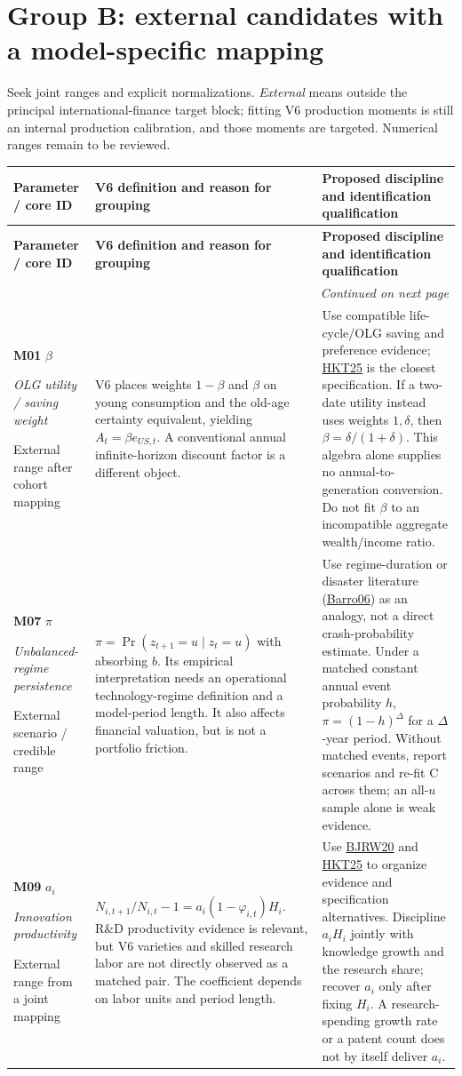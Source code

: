 \documentclass[10pt,a4paper,landscape]{article}
\makeatletter
\newcommand{\lit}[2]{\hyperlink{ref:#1}{#2}}
\newenvironment{grouptable}{%
\fontsize{9.4}{10.8}\selectfont\setlength{\parskip}{1.5pt}
\begin{longtable}{@{}P{\dimexpr .18\textwidth-6.67pt\relax}P{\dimexpr .385\textwidth-6.67pt\relax}P{\dimexpr .435\textwidth-6.66pt\relax}@{}}
\toprule\rowcolor{tablehead}\textbf{Parameter / core ID} & \textbf{V6 definition and reason for grouping} & \textbf{Proposed discipline and identification qualification}\\\midrule
\endfirsthead
\toprule\rowcolor{tablehead}\textbf{Parameter / core ID} & \textbf{V6 definition and reason for grouping} & \textbf{Proposed discipline and identification qualification}\\\midrule
\endhead
\midrule\multicolumn{3}{r}{\footnotesize\itshape Continued on next page}\\\endfoot
\bottomrule\endlastfoot
}{\end{longtable}}
\makeatother
\begin{document}
\clearpage
\section{Group B: external candidates with a model-specific mapping}
Seek joint ranges and explicit normalizations. \emph{External} means outside the principal international-finance target block; fitting V6 production moments is still an internal production calibration, and those moments are targeted. Numerical ranges remain to be reviewed.

\begin{grouptable}
\textbf{M01} $\beta$\par \textit{OLG utility / saving weight}\par {\footnotesize External range after cohort mapping} & V6 places weights $1-\beta$ and $\beta$ on young consumption and the old-age certainty equivalent, yielding $A_t=\beta e_{US,t}$. A conventional annual infinite-horizon discount factor is a different object. & Use compatible life-cycle/OLG saving and preference evidence; \lit{HKT}{HKT25} is the closest specification. If a two-date utility instead uses weights $1,\delta$, then $\beta=\delta/(1+\delta)$. This algebra alone supplies no annual-to-generation conversion. Do not fit $\beta$ to an incompatible aggregate wealth/income ratio.\\[3pt]
\textbf{M07} $\pi$\par \textit{Unbalanced-regime persistence}\par {\footnotesize External scenario / credible range} & $\pi=\Pr(z_{t+1}=u\mid z_t=u)$ with absorbing $b$. Its empirical interpretation needs an operational technology-regime definition and a model-period length. It also affects financial valuation, but is not a portfolio friction. & Use regime-duration or disaster literature (\lit{BARRO}{Barro06}) as an analogy, not a direct crash-probability estimate. Under a matched constant annual event probability $h$, $\pi=(1-h)^{\Delta}$ for a $\Delta$-year period. Without matched events, report scenarios and re-fit C across them; an all-$u$ sample alone is weak evidence.\\[3pt]
\textbf{M09} $a_i$\par \textit{Innovation productivity}\par {\footnotesize External range from a joint mapping} & $N_{i,t+1}/N_{i,t}-1=a_i(1-\varphi_{i,t})H_i$. R\&D productivity evidence is relevant, but V6 varieties and skilled research labor are not directly observed as a matched pair. The coefficient depends on labor units and period length. & Use \lit{BJRW}{BJRW20} and \lit{HKT}{HKT25} to organize evidence and specification alternatives. Discipline $a_iH_i$ jointly with knowledge growth and the research share; recover $a_i$ only after fixing $H_i$. A research-spending growth rate or a patent count does not by itself deliver $a_i$.\\[3pt]

\end{grouptable}
\end{document}

